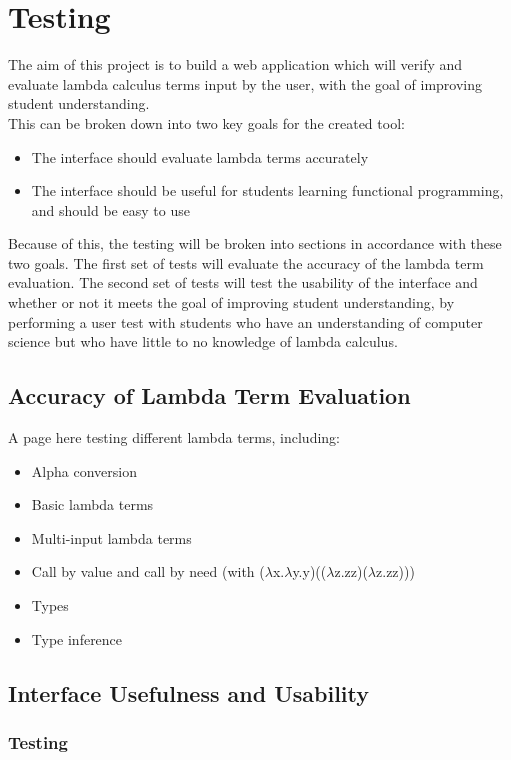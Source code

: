 \documentclass[a4paper,12pt]{report}
\begin{document}
\chapter{Testing}
The aim of this project is to build a web application which will verify and evaluate lambda calculus terms input by the user, with the goal of improving student understanding.\\

This can be broken down into two key goals for the created tool:
\begin{itemize}
	\item The interface should evaluate lambda terms accurately
	\item The interface should be useful for students learning functional programming, and should be easy to use
\end{itemize}

Because of this, the testing will be broken into sections in accordance with these two goals. The first set of tests will evaluate the accuracy of the lambda term evaluation. The second set of tests will test the usability of the interface and whether or not it meets the goal of improving student understanding, by performing a user test with students who have an understanding of computer science but who have little to no knowledge of lambda calculus.

\section{Accuracy of Lambda Term Evaluation}
\label{Accuracy of Lambda Term Evaluation}
A page here testing different lambda terms, including:
\begin{itemize}
	\item Alpha conversion
	\item Basic lambda terms
	\item Multi-input lambda terms
	\item Call by value and call by need (with ($\lambda$x.$\lambda$y.y)(($\lambda$z.zz)($\lambda$z.zz)))
	\item Types
	\item Type inference
\end{itemize}
\newpage

\section{Interface Usefulness and Usability}
\label{interface usefulness and usability}
\subsection{Testing}
\end{document}
